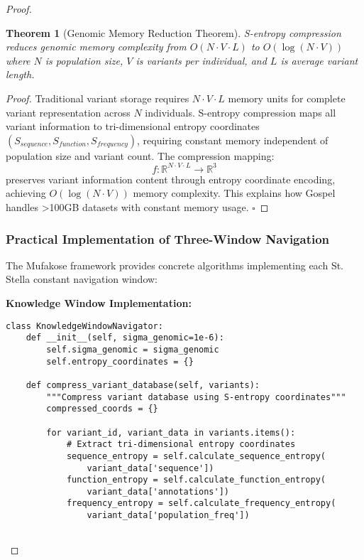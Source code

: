 \documentclass[12pt,a4paper]{article}
\newtheorem{theorem}{Theorem}[section]
\begin{document}
\begin{proof}
\begin{theorem}[Genomic Memory Reduction Theorem]
S-entropy compression reduces genomic memory complexity from $O(N \cdot V \cdot L)$ to $O(\log(N \cdot V))$ where $N$ is population size, $V$ is variants per individual, and $L$ is average variant length.
\end{theorem}

\begin{proof}
Traditional variant storage requires $N \cdot V \cdot L$ memory units for complete variant representation across $N$ individuals. S-entropy compression maps all variant information to tri-dimensional entropy coordinates $(S_{sequence}, S_{function}, S_{frequency})$, requiring constant memory independent of population size and variant count. The compression mapping:
$$f: \mathbb{R}^{N \cdot V \cdot L} \rightarrow \mathbb{R}^3$$
preserves variant information content through entropy coordinate encoding, achieving $O(\log(N \cdot V))$ memory complexity. This explains how Gospel handles >100GB datasets with constant memory usage. $\square$
\end{proof}

\subsubsection{Practical Implementation of Three-Window Navigation}

The Mufakose framework provides concrete algorithms implementing each St. Stella constant navigation window:

\textbf{Knowledge Window Implementation:}
\begin{lstlisting}[style=pythonstyle, caption=Knowledge Window Confirmation Processing]
class KnowledgeWindowNavigator:
    def __init__(self, sigma_genomic=1e-6):
        self.sigma_genomic = sigma_genomic
        self.entropy_coordinates = {}
        
    def compress_variant_database(self, variants):
        """Compress variant database using S-entropy coordinates"""
        compressed_coords = {}
        
        for variant_id, variant_data in variants.items():
            # Extract tri-dimensional entropy coordinates
            sequence_entropy = self.calculate_sequence_entropy(
                variant_data['sequence'])
            function_entropy = self.calculate_function_entropy(
                variant_data['annotations'])
            frequency_entropy = self.calculate_frequency_entropy(
                variant_data['population_freq'])
            

\end{lstlisting}
\end{proof}
\end{document}
